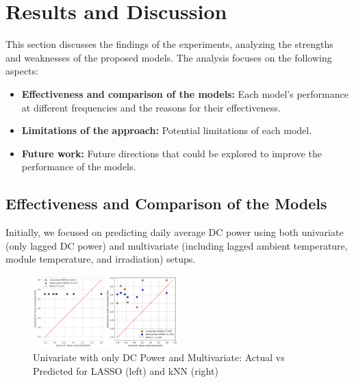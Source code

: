 \section{Results and Discussion}

This section discusses the findings of the experiments, analyzing the strengths and weaknesses of the proposed models. The analysis focuses on the following aspects:

\begin{itemize}
    \item \textbf{Effectiveness and comparison of the models:} Each model's performance at different frequencies and the reasons for their effectiveness.
    
    \item \textbf{Limitations of the approach:} Potential limitations of each model.
    
    \item \textbf{Future work:} Future directions that could be explored to improve the performance of the models.
\end{itemize}

\subsection{Effectiveness and Comparison of the Models}

Initially, we focused on predicting daily average DC power using both univariate (only lagged DC power) and multivariate (including lagged ambient temperature, module temperature, and irradiation) setups.

\begin{figure}[h]
    \centering
    \includegraphics[width=0.5\textwidth]{Figures/uni-multi.jpg}
    \caption{Univariate with only DC Power and Multivariate: Actual vs Predicted for LASSO (left) and kNN (right)}
    \label{fig:uni-multi}
\end{figure}

